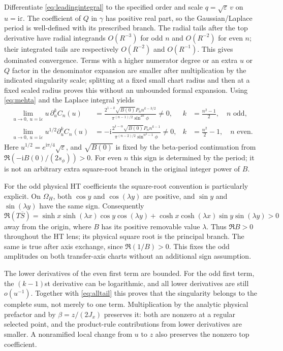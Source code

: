 \documentclass[11pt]{article}
\numberwithin{equation}{section}
\theoremstyle{definition}
\newcommand{\ii}{\mathrm i}
\newcommand{\eps}{\varepsilon}
\newcommand{\OH}{\Omega_H}
\begin{document}
Differentiate \eqref{eq:leadingintegral} to the specified order and
scale $q=\sqrt\eps\,v$ on $u=\ii\eps$. The coefficient of $Q$ in
$\gamma$ has positive real part, so the Gaussian/Laplace period is
well-defined with its prescribed branch. The radial tails after the
top derivative have radial integrands $O(R^{-3})$ for odd $n$ and
$O(R^{-2})$ for even $n$; their integrated tails are respectively
$O(R^{-2})$ and $O(R^{-1})$. This gives dominated convergence.
Terms with a higher numerator
degree or an extra $u$ or $Q$ factor in the denominator expansion are
smaller after multiplication by the indicated singularity scale;
splitting at a fixed small chart radius and then at a fixed scaled
radius proves this without an unbounded formal expansion.
Using \eqref{eq:mehta} and the Laplace integral yields
\begin{align}
 \lim_{u\to0,\ u=\ii\eps}u\,\partial_u^kC_n(u)
 &=\frac{2^{1-k}\sqrt{B(0)}P_n n^{k-3/2}}
        {\pi^{(n-1)/2}\sin^{2k}\phi}\ne0,
 &k&=\frac{n^2-1}{2},\quad n\text{ odd},\label{eq:oddfirst}\\
 \lim_{u\to0,\ u=\ii\eps}u^{1/2}\partial_u^kC_n(u)
 &=-\ii\frac{2^{1-\alpha}\sqrt{B(0)}P_n n^{k-1}}
        {\pi^{(n-2)/2}\sin^{n^2-1}\phi}\ne0,
 &k&=\frac{n^2}{2}-1,\quad n\text{ even}.\label{eq:evenfirst}
\end{align}
Here $u^{1/2}=e^{\ii\pi/4}\sqrt\eps$, and $\sqrt{B(0)}$ is fixed
by the beta-period continuation from
$\Re(-\ii B(0)/(2s_\phi))>0$. For even $n$ this sign is determined
by the period; it is not an arbitrary extra square-root branch in the
original integer power of $B$.

For the odd physical HT coefficients the square-root convention is
particularly explicit. On $\OH$, both $\cos y$ and $\cos(\lambda y)$
are positive, and $\sin y$ and $\sin(\lambda y)$ have the same sign.
Consequently
\[
 \Re(T\overline S)=\sinh x\sinh(\lambda x)\cos y\cos(\lambda y)
 +\cosh x\cosh(\lambda x)\sin y\sin(\lambda y)>0
\]
away from the origin, where $B$ has its positive removable value
$\lambda$. Thus $\Re B>0$ throughout the HT lens; its physical square
root is the principal branch. The same is true after axis exchange,
since $\Re(1/B)>0$. This fixes the odd amplitudes on both transfer-axis
charts without an additional sign assumption.

The lower derivatives of the even first term are bounded. For the odd
first term, the $(k-1)$st derivative can be logarithmic, and all lower
derivatives are still $o(u^{-1})$. Together with
\eqref{eq:alltail} this proves that the singularity belongs to the
complete sum, not merely to one term. Multiplication by the analytic
physical prefactor and by $\beta=z/(2J_x)$ preserves it: both are
nonzero at a regular selected point, and the product-rule contributions
from lower derivatives are smaller. A nonramified local change from
$u$ to $z$ also preserves the nonzero top coefficient.
\end{document}
